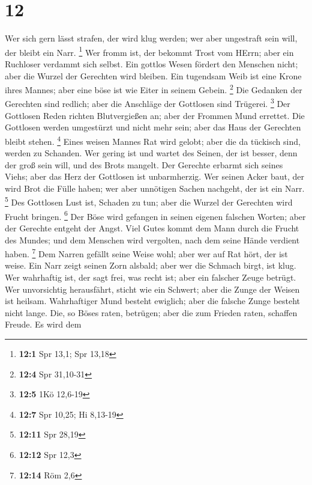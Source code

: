 \hypertarget{section-4}{%
\section{12}\label{section-4}}

 Wer sich gern lässt strafen, der wird klug werden; wer aber
ungestraft sein will, der bleibt ein Narr. \footnote{\textbf{12:1} Spr
  13,1; Spr 13,18}  Wer fromm ist, der bekommt Trost vom
HErrn; aber ein Ruchloser verdammt sich selbst.  Ein gottlos
Wesen fördert den Menschen nicht; aber die Wurzel der Gerechten wird
bleiben.  Ein tugendsam Weib ist eine Krone ihres Mannes;
aber eine böse ist wie Eiter in seinem Gebein. \footnote{\textbf{12:4}
  Spr 31,10-31}  Die Gedanken der Gerechten sind redlich;
aber die Anschläge der Gottlosen sind Trügerei. \footnote{\textbf{12:5}
  1Kö 12,6-19}  Der Gottlosen Reden richten Blutvergießen
an; aber der Frommen Mund errettet.  Die Gottlosen werden
umgestürzt und nicht mehr sein; aber das Haus der Gerechten bleibt
stehen. \footnote{\textbf{12:7} Spr 10,25; Hi 8,13-19} 
Eines weisen Mannes Rat wird gelobt; aber die da tückisch sind, werden
zu Schanden.  Wer gering ist und wartet des Seinen, der ist
besser, denn der groß sein will, und des Brots mangelt. 
Der Gerechte erbarmt sich seines Viehs; aber das Herz der Gottlosen ist
unbarmherzig.  Wer seinen Acker baut, der wird Brot die
Fülle haben; wer aber unnötigen Sachen nachgeht, der ist ein Narr.
\footnote{\textbf{12:11} Spr 28,19}  Des Gottlosen Lust
ist, Schaden zu tun; aber die Wurzel der Gerechten wird Frucht bringen.
\footnote{\textbf{12:12} Spr 12,3}  Der Böse wird gefangen
in seinen eigenen falschen Worten; aber der Gerechte entgeht der Angst.
 Viel Gutes kommt dem Mann durch die Frucht des Mundes; und
dem Menschen wird vergolten, nach dem seine Hände verdient haben.
\footnote{\textbf{12:14} Röm 2,6}  Dem Narren gefällt seine
Weise wohl; aber wer auf Rat hört, der ist weise.  Ein Narr
zeigt seinen Zorn alsbald; aber wer die Schmach birgt, ist klug.
 Wer wahrhaftig ist, der sagt frei, was recht ist; aber ein
falscher Zeuge betrügt.  Wer unvorsichtig herausfährt,
sticht wie ein Schwert; aber die Zunge der Weisen ist heilsam.
 Wahrhaftiger Mund besteht ewiglich; aber die falsche Zunge
besteht nicht lange.  Die, so Böses raten, betrügen; aber
die zum Frieden raten, schaffen Freude.  Es wird dem
